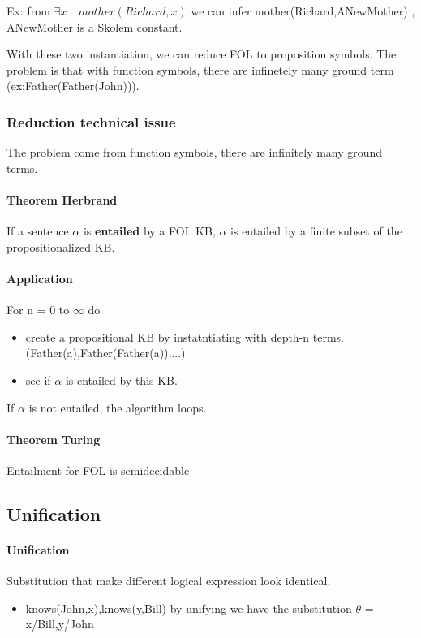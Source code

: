   Ex:   from   $\exists   x\quad   mother(Richard,x)$   we   can   infer
  mother(Richard,ANewMother) , ANewMother is a Skolem constant.

With these two instantiation, we  can reduce FOL to proposition symbols.
The problem  is that  with function symbols,  there are  infinetely many
ground term (ex:Father(Father(John))).

\subsubsection{Reduction technical issue}

The problem come from function symbols, there are infinitely many ground
terms.

\paragraph{Theorem Herbrand} If a sentence $\alpha$ is \textbf{entailed} by a FOL
KB, $\alpha$ is entailed by a finite subset of the propositionalized KB.

\paragraph{Application} For n = 0 to $\infty$ do 
	\begin{itemize}
        \item create a propositional KB  by instatntiating with depth-n terms.
(Father(a),Father(Father(a)),...)
		\item see if $\alpha$ is entailed by this KB.
	\end{itemize}

 If $\alpha$ is not entailed, the algorithm loops.

\paragraph{Theorem Turing} Entailment for FOL is semidecidable	

\subsection{Unification}

\paragraph{Unification}   Substitution  that   make  different   logical
expression look identical.
	\begin{itemize}
          \item knows(John,x),knows(y,Bill) by unifying we have the substitution
        $\theta$ = {x/Bill,y/John}
	\end{itemize}

